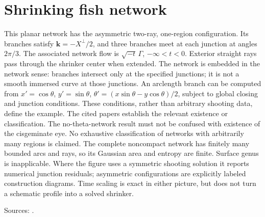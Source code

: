 \chapter{Shrinking fish network}\label{sec:catalogue-network-fish}
\begin{example}\label{ex:catalogue-network-fish}
This planar network has the asymmetric two-ray, one-region configuration. Its branches satisfy $\mathbf k=-X^\perp/2$, and three branches meet at each junction at angles $2\pi/3$. The associated network flow is $\sqrt{-t}\,\Gamma$, $-\infty<t<0$. Exterior straight rays pass through the shrinker center when extended. The network is embedded in the network sense: branches intersect only at the specified junctions; it is not a smooth immersed curve at those junctions.
An arclength branch can be computed from $x'=\cos\theta$, $y'=\sin\theta$, $\theta'=(x\sin\theta-y\cos\theta)/2$, subject to global closing and junction conditions. These conditions, rather than arbitrary shooting data, define the example. The cited papers establish the relevant existence or classification. The no-theta-network result must not be confused with existence of the cisgeminate eye. No exhaustive classification of networks with arbitrarily many regions is claimed.
The complete noncompact network has finitely many bounded arcs and rays, so its Gaussian area and entropy are finite. Surface genus is inapplicable. Where the figure uses a symmetric shooting solution it reports numerical junction residuals; asymmetric configurations are explicitly labeled construction diagrams. Time scaling is exact in either picture, but does not turn a schematic profile into a solved shrinker.
\par Sources: \cite{CatChang2026,CatChenGuo2007}.
\end{example}

